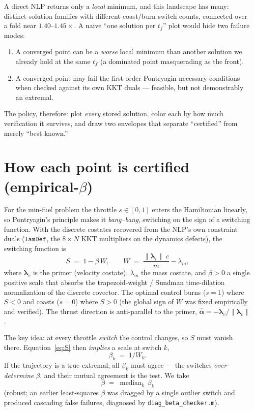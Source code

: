 \documentclass[11pt]{article}
\newcommand{\tf}{t_f}
\newcommand{\lamv}{\boldsymbol{\lambda}_v}
\newcommand{\lamm}{\lambda_m}
\begin{document}
A direct NLP returns only a \emph{local} minimum, and this landscape has many:
distinct solution families with different coast/burn switch counts, connected
over a fold near $1.40$--$1.45\times$. A naive ``one solution per $\tf$'' plot
would hide two failure modes:
\begin{enumerate}
\item A converged point can be a \emph{worse} local minimum than another
solution we already hold at the same $\tf$ (a dominated point masquerading as
the front).
\item A converged point may fail the first-order Pontryagin necessary
conditions when checked against its own KKT duals --- feasible, but not
demonstrably an extremal.
\end{enumerate}
The policy, therefore: plot \emph{every} stored solution, color each by how much
verification it survives, and draw two envelopes that separate ``certified''
from merely ``best known.''

\section{How each point is certified (empirical-$\beta$)}
\label{sec:cert}

For the min-fuel problem the throttle $s\in[0,1]$ enters the Hamiltonian
linearly, so Pontryagin's principle makes it \emph{bang--bang}, switching on the
sign of a switching function. With the discrete costates recovered from the
NLP's own constraint duals ($\texttt{lamDef}$, the $8\times N$ KKT multipliers on
the dynamics defects), the switching function is
\begin{equation}
  S \;=\; 1 - \beta\,W,
  \qquad
  W \;=\; \frac{\lVert\lamv\rVert\,c}{m} - \lamm ,
  \label{eq:S}
\end{equation}
where $\lamv$ is the primer (velocity costate), $\lamm$ the mass costate, and
$\beta>0$ a single positive scale that absorbs the trapezoid-weight / Sundman
time-dilation normalization of the discrete covector. The optimal control burns
($s=1$) where $S<0$ and coasts ($s=0$) where $S>0$ (the global sign of $W$ was
fixed empirically and verified). The thrust direction is anti-parallel to the
primer, $\hat{\boldsymbol{\alpha}}=-\lamv/\lVert\lamv\rVert$.

The key idea: at every throttle \emph{switch} the control changes, so $S$ must
vanish there. Equation~\eqref{eq:S} then \emph{implies} a scale at switch $k$,
\begin{equation}
  \beta_k \;=\; 1/W_k .
\end{equation}
If the trajectory is a true extremal, all $\beta_k$ must agree --- the switches
\emph{over-determine} $\beta$, and their mutual agreement is the test. We take
\begin{equation}
  \beta \;=\; \operatorname{median}_k\,\beta_k
\end{equation}
(robust; an earlier least-squares $\beta$ was dragged by a single outlier switch
and produced cascading false failures, diagnosed by \texttt{diag\_beta\_checker.m}).
\end{document}
